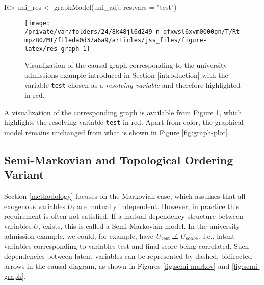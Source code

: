 \documentclass[
  nojss]{jss}
\begin{document}
\begin{CodeChunk}
\begin{CodeInput}
R> uni_res <- graphModel(uni_adj, res.vars = "test")
\end{CodeInput}
\end{CodeChunk}

\begin{CodeChunk}
\begin{figure}

{\centering \texttt{[image: /private/var/folders/24/8k48jl6d249\_n\_qfxwsl6xvm0000gn/T/RtmpzB0ZMT/fileda0d37a6a9/articles/jss\_files/figure-latex/res-graph-1]} 

}

\caption[Visualization of the causal graph corresponding to the university admissions example introduced in Section \ref{introduction} with the variable \texttt{test} chosen as a \textit{resolving variable} and therefore highlighted in red]{Visualization of the causal graph corresponding to the university admissions example introduced in Section \ref{introduction} with the variable \texttt{test} chosen as a \textit{resolving variable} and therefore highlighted in red.}\label{fig:res-graph}
\end{figure}
\end{CodeChunk}

A visualization of the corresponding graph is available from Figure
\ref{fig:res-graph}, which highlights the resolving variable
\texttt{test} in red. Apart from color, the graphical model remains
unchanged from what is shown in Figure \ref{fig:graph-plot}.

\hypertarget{semi-markovian-and-topological-ordering-variant}{%
\subsection{Semi-Markovian and Topological Ordering
Variant}\label{semi-markovian-and-topological-ordering-variant}}

Section \ref{methodology} focuses on the Markovian case, which assumes
that all exogenous variables \(U_i\) are mutually independent. However,
in practice this requirement is often not satisfied. If a mutual
dependency structure between variables \(U_i\) exists, this is called a
Semi-Markovian model. In the university admission example, we could, for
example, have
\(U_{\text{test}} \not\!\perp\!\!\!\perp U_{\text{score}}\), i.e.,
latent variables corresponding to variables test and final score being
correlated. Such dependencies between latent variables can be
represented by dashed, bidirected arrows in the causal diagram, as shown
in Figures \ref{fig:semi-markov} and \ref{fig:semi-graph}.
\end{document}
